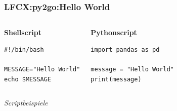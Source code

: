 

\begin{frame}[fragile]  
  \frametitle{LFCX:py2go:Hello World}

  \begin{columns}[t]
    \begin{center}
    \begin{minipage}{0.5\textwidth}
      \textbf{Shellscript}

      \begin{verbatim}
#!/bin/bash
        
MESSAGE="Hello World"
echo $MESSAGE

      \end{verbatim}
    \end{minipage}
    \end{center}
  
    \begin{center}
    \begin{minipage}{0.5\textwidth}
      \textbf{Pythonscript}
      
      \begin{verbatim}
import pandas as pd

message = "Hello World"
print(message)
      \end{verbatim}

    \end{minipage}
    \end{center}
  \end{columns}

  \vspace{0.6cm}
  \begin{flushright}
    \begin{tiny}
      \textrm{\textit{Scriptbeispiele}}
    \end{tiny}
  \end{flushright}
\end{frame}